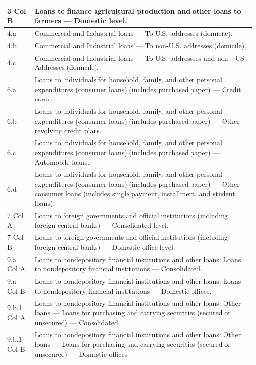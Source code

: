 \documentclass[conference]{IEEEtran}
\begin{document}
\begin{table}[htbp]
\begin{tabular}{|p{3cm}|p{12cm}|}
		3 Col B & Loans to finance agricultural production and other loans to farmers — Domestic level. \\
		\hline
		4.a & Commercial and Industrial loans — To U.S. addresses (domicile). \\
		\hline
		4.b & Commercial and Industrial loans — To non-U.S. addresses (domicile). \\
		\hline
		4.c & Commercial and Industrial loans — To U.S. addressees and non - US Addresses (domicile). \\
		\hline
		6.a & Loans to individuals for household, family, and other personal expenditures (consumer loans) (includes purchased paper) — Credit cards. \\
		\hline
		6.b & Loans to individuals for household, family, and other personal expenditures (consumer loans) (includes purchased paper) — Other revolving credit plans. \\
		\hline
		6.c & Loans to individuals for household, family, and other personal expenditures (consumer loans) (includes purchased paper) — Automobile loans. \\
		\hline
		6.d & Loans to individuals for household, family, and other personal expenditures (consumer loans) (includes purchased paper) — Other consumer loans (includes single payment, installment, and student loans). \\
		\hline
		7 Col A & Loans to foreign governments and official institutions (including foreign central banks) — Consolidated level. \\
		\hline
		7 Col B & Loans to foreign governments and official institutions (including foreign central banks) — Domestic office level. \\
		\hline
		9.a Col A & Loans to nondepository financial institutions and other loans: Loans to nondepository financial institutions — Consolidated. \\
		\hline
		9.a Col B & Loans to nondepository financial institutions and other loans: Loans to nondepository financial institutions — Domestic offices. \\
		\hline
		9.b.1 Col A & Loans to nondepository financial institutions and other loans: Other loans — Loans for purchasing and carrying securities (secured or unsecured) — Consolidated. \\
		\hline
		9.b.1 Col B & Loans to nondepository financial institutions and other loans: Other loans — Loans for purchasing and carrying securities (secured or unsecured) — Domestic offices. \\

\end{tabular}
\end{table}
\end{document}
